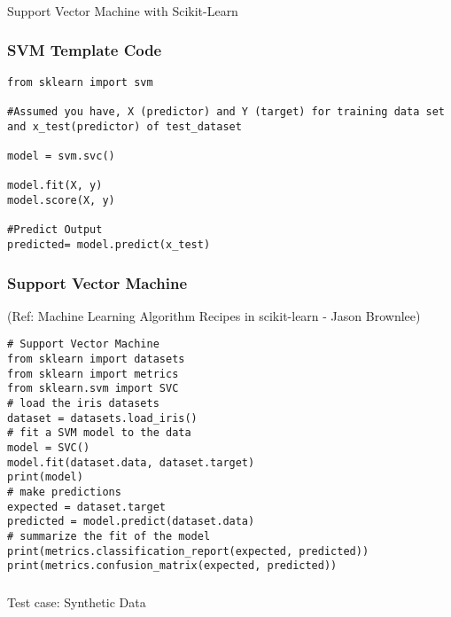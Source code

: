 \begin{frame}[fragile]\frametitle{}
\begin{center}
{\Large Support Vector Machine with Scikit-Learn}
\end{center}
\end{frame}

\begin{frame}[fragile]\frametitle{SVM Template Code}
\begin{lstlisting}
from sklearn import svm 

#Assumed you have, X (predictor) and Y (target) for training data set and x_test(predictor) of test_dataset 

model = svm.svc() 

model.fit(X, y) 
model.score(X, y) 

#Predict Output 
predicted= model.predict(x_test)
\end{lstlisting}
\end{frame}


\begin{frame}[fragile]\frametitle{Support Vector Machine}
{\tiny (Ref: Machine Learning Algorithm Recipes in scikit-learn - Jason Brownlee)}


\begin{lstlisting}
# Support Vector Machine
from sklearn import datasets
from sklearn import metrics
from sklearn.svm import SVC
# load the iris datasets
dataset = datasets.load_iris()
# fit a SVM model to the data
model = SVC()
model.fit(dataset.data, dataset.target)
print(model)
# make predictions
expected = dataset.target
predicted = model.predict(dataset.data)
# summarize the fit of the model
print(metrics.classification_report(expected, predicted))
print(metrics.confusion_matrix(expected, predicted))
\end{lstlisting}


\end{frame}



\begin{frame}[fragile]\frametitle{}
\begin{center}
{\Large Test case: Synthetic Data}
\end{center}
\end{frame}

